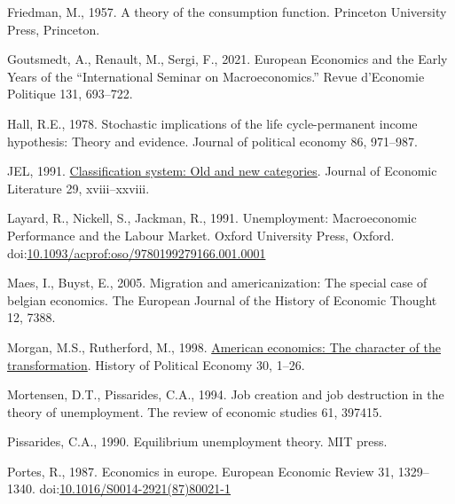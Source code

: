 \documentclass[]{elsarticle} %
\newlength{\cslhangindent}
\newlength{\cslentryspacingunit} %
\newenvironment{CSLReferences}[2] %
 {%
  \setlength{\parindent}{0pt}
  \ifodd #1
  \let\oldpar\par
  \def\par{\hangindent=\cslhangindent\oldpar}
  \fi
  \setlength{\parskip}{#2\cslentryspacingunit}
 }%
 {}
\begin{document}
\begin{CSLReferences}{1}{0}
\leavevmode{}%
Friedman, M., 1957. A theory of the consumption function. Princeton
University Press, Princeton.

\leavevmode{}%
Goutsmedt, A., Renault, M., Sergi, F., 2021. European {Economics} and
the {Early Years} of the {``{International Seminar} on
{Macroeconomics}.''} Revue d'Economie Politique 131, 693--722.

\leavevmode{}%
Hall, R.E., 1978. Stochastic implications of the life cycle-permanent
income hypothesis: Theory and evidence. Journal of political economy 86,
971--987.

\leavevmode{}%
JEL, 1991. \href{https://www.jstor.org/stable/2727351}{Classification
system: Old and new categories}. Journal of Economic Literature 29,
xviii--xxviii.

\leavevmode{}%
Layard, R., Nickell, S., Jackman, R., 1991. Unemployment: {Macroeconomic
Performance} and the {Labour Market}. {Oxford University Press},
{Oxford}.
doi:\href{https://doi.org/10.1093/acprof:oso/9780199279166.001.0001}{10.1093/acprof:oso/9780199279166.001.0001}

\leavevmode{}%
Maes, I., Buyst, E., 2005. Migration and americanization: The special
case of belgian economics. The European Journal of the History of
Economic Thought 12, 7388.

\leavevmode{}%
Morgan, M.S., Rutherford, M., 1998.
\href{http://search.ebscohost.com/login.aspx?direct=true\&db=bth\&AN=7752144\&lang=fr\&site=ehost-live}{American
economics: The character of the transformation}. History of Political
Economy 30, 1--26.

\leavevmode{}%
Mortensen, D.T., Pissarides, C.A., 1994. Job creation and job
destruction in the theory of unemployment. The review of economic
studies 61, 397415.

\leavevmode{}%
Pissarides, C.A., 1990. Equilibrium unemployment theory. MIT press.

\leavevmode{}%
Portes, R., 1987. Economics in europe. European Economic Review 31,
1329--1340.
doi:\href{https://doi.org/10.1016/S0014-2921(87)80021-1}{10.1016/S0014-2921(87)80021-1}


\end{CSLReferences}
\end{document}
